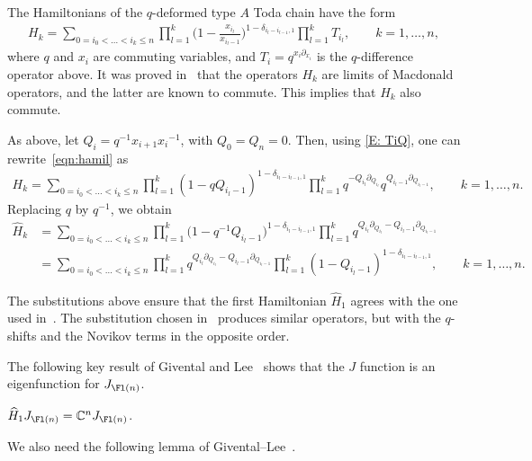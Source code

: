 The Hamiltonians of the $q$-deformed type $A$ Toda chain have the form
\begin{align}\label{eqn:hamil}
 H_k=\sum_{0= i_0<\dots<i_k\leq n} \prod_{l=1}^{k}\biggl(1-\frac{x_{i_l}}{x_{i_l-1}}\biggr)^{1-\delta_{i_l-i_{l-1},1}} \prod_{l=1}^{k} T_{i_l},\qquad k=1,\dots,n,
\end{align}
where $q$ and $x_i$ are commuting variables, and $T_i=q^{x_i\partial_{x_i}}$ is the $q$-difference operator above. It was proved in~\cite{gloI} that the operators $H_k$ are limits of Macdonald operators, and the latter are known to commute.
This implies that $H_k$ also commute.

As above, let $Q_i=q^{-1}{x_{i+1}}{x_i}^{-1}$, with $Q_0=Q_n=0$. Then, using
\eqref{E: TiQ}, one can rewrite~\eqref{eqn:hamil} as
\begin{align*}
 H_k=\sum_{0= i_0<\dots<i_k\leq n} \prod_{l=1}^{k}(1-qQ_{i_l-1})^{1-\delta_{i_l-i_{l-1},1}} \prod_{l=1}^{k} q^{-Q_{i_l}\partial_{Q_{i_l}}}q^{Q_{i_l-1}\partial_{Q_{i_l-1}}},\qquad k=1,\dots,n.
\end{align*}
Replacing $q$ by $q^{-1}$, we obtain
\begin{align*}%
 \widehat{H}_k&{}= \sum_{0= i_0<\dots<i_k\leq n}\prod_{l=1}^{k}\bigl(1-q^{-1}Q_{{i_l}-1}\bigr)^{1-\delta_{i_l-i_{l-1},1}} \prod_{l=1}^{k} q^{Q_{i_l}\partial_{Q_{i_l}}-Q_{i_l-1}\partial_{Q_{{i_l}-1}}}\\
 &{}=\sum_{0= i_0<\dots<i_k\leq n} \prod_{l=1}^{k} q^{Q_{i_l}\partial_{Q_{i_l}}-Q_{i_l-1}\partial_{Q_{{i_l}-1}}}\prod_{l=1}^{k}(1-Q_{{i_l}-1})^{1-\delta_{i_l-i_{l-1},1}}
 ,\qquad k=1,\dots,n .
 \end{align*}
\begin{Remark} The substitutions above
ensure that the first Hamiltonian $\widehat{H}_1$ agrees
with the one used in~\cite{givental_lee}. The substitution chosen in~\cite{act:2017}
produces similar
operators, but with the $q$-shifts and the Novikov terms in the opposite order.
\end{Remark}
The following key result of Givental and Lee~\cite[Theorem~2]{givental_lee} shows that the $J$ function is an eigenfunction for $J_{\Fl(n)}$.

\begin{Theorem}\label{thm:GLeemain}
 $\widehat{H}_1J_{\Fl(n)}=\mathbb{C}^n J_{\Fl(n)}$.
\end{Theorem}

We also need the following lemma of Givental--Lee~\cite{givental_lee}.

